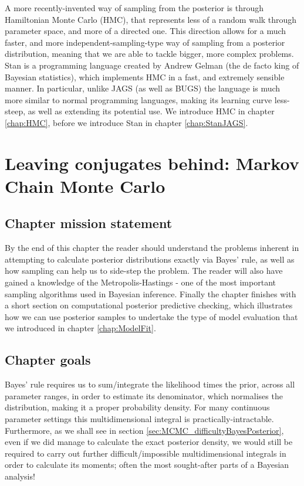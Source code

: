 \documentclass[11pt,fullpage]{book}
\begin{document}
A more recently-invented way of sampling from the posterior is through Hamiltonian Monte Carlo (HMC), that represents less of a random walk through parameter space, and more of a directed one. This direction allows for a much faster, and more independent-sampling-type way of sampling from a posterior distribution, meaning that we are able to tackle bigger, more complex problems. Stan\cite{stan-software:2014} is a programming language created by Andrew Gelman (the de facto king of Bayesian statistics), which implements HMC in a fast, and extremely sensible manner. In particular, unlike JAGS (as well as BUGS) the language is much more similar to normal programming languages, making its learning curve less-steep, as well as extending its potential use. We introduce HMC in chapter \ref{chap:HMC}, before we introduce Stan in chapter \ref{chap:StanJAGS}.

\chapter{Leaving conjugates behind: Markov Chain Monte Carlo}\label{chap:MCMC}
\section{Chapter mission statement}
By the end of this chapter the reader should understand the problems inherent in attempting to calculate posterior distributions exactly via Bayes' rule, as well as how sampling can help us to side-step the problem. The reader will also have gained a knowledge of the Metropolis-Hastings - one of the most important sampling algorithms used in Bayesian inference. Finally the chapter finishes with a short section on computational posterior predictive checking, which illustrates how we can use posterior samples to undertake the type of model evaluation that we introduced in chapter \ref{chap:ModelFit}.

\section{Chapter goals}
Bayes' rule requires us to sum/integrate the likelihood times the prior, across all parameter ranges, in order to estimate its denominator, which normalises the distribution, making it a proper probability density. For many continuous parameter settings this multidimensional integral is practically-intractable. Furthermore, as we shall see in section \ref{sec:MCMC_difficultyBayesPosterior}, even if we did manage to calculate the exact posterior density, we would still be required to carry out further difficult/impossible multidimensional integrals in order to calculate its moments; often the most sought-after parts of a Bayesian analysis!
\end{document}
